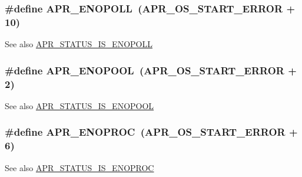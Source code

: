 \subsubsection[{\texorpdfstring{A\+P\+R\+\_\+\+E\+N\+O\+P\+O\+LL}{APR_ENOPOLL}}]{\setlength{\rightskip}{0pt plus 5cm}\#define A\+P\+R\+\_\+\+E\+N\+O\+P\+O\+LL~({\bf A\+P\+R\+\_\+\+O\+S\+\_\+\+S\+T\+A\+R\+T\+\_\+\+E\+R\+R\+OR} + 10)}\hypertarget{group__APR__Error_gaeff8d4ed7bf9b99cbe62a3e7068e85b7}{}\label{group__APR__Error_gaeff8d4ed7bf9b99cbe62a3e7068e85b7}
\begin{DoxySeeAlso}{See also}
\hyperlink{group__APR__STATUS__IS_ga590bc2090fe120d142853dec27eaf9e8}{A\+P\+R\+\_\+\+S\+T\+A\+T\+U\+S\+\_\+\+I\+S\+\_\+\+E\+N\+O\+P\+O\+LL} 
\end{DoxySeeAlso}
\subsubsection[{\texorpdfstring{A\+P\+R\+\_\+\+E\+N\+O\+P\+O\+OL}{APR_ENOPOOL}}]{\setlength{\rightskip}{0pt plus 5cm}\#define A\+P\+R\+\_\+\+E\+N\+O\+P\+O\+OL~({\bf A\+P\+R\+\_\+\+O\+S\+\_\+\+S\+T\+A\+R\+T\+\_\+\+E\+R\+R\+OR} + 2)}\hypertarget{group__APR__Error_gaa8461873202e5e0b4c0ea261e05b07a9}{}\label{group__APR__Error_gaa8461873202e5e0b4c0ea261e05b07a9}
\begin{DoxySeeAlso}{See also}
\hyperlink{group__APR__STATUS__IS_ga71f149437af305f0a0cabde2cc3f3b19}{A\+P\+R\+\_\+\+S\+T\+A\+T\+U\+S\+\_\+\+I\+S\+\_\+\+E\+N\+O\+P\+O\+OL} 
\end{DoxySeeAlso}
\subsubsection[{\texorpdfstring{A\+P\+R\+\_\+\+E\+N\+O\+P\+R\+OC}{APR_ENOPROC}}]{\setlength{\rightskip}{0pt plus 5cm}\#define A\+P\+R\+\_\+\+E\+N\+O\+P\+R\+OC~({\bf A\+P\+R\+\_\+\+O\+S\+\_\+\+S\+T\+A\+R\+T\+\_\+\+E\+R\+R\+OR} + 6)}\hypertarget{group__APR__Error_ga18aa6d4ebaefda39478649c20bbeb9df}{}\label{group__APR__Error_ga18aa6d4ebaefda39478649c20bbeb9df}
\begin{DoxySeeAlso}{See also}
\hyperlink{group__APR__STATUS__IS_ga566f4c9b9db8a0c31199a938bdc4e38a}{A\+P\+R\+\_\+\+S\+T\+A\+T\+U\+S\+\_\+\+I\+S\+\_\+\+E\+N\+O\+P\+R\+OC} 
\end{DoxySeeAlso}

